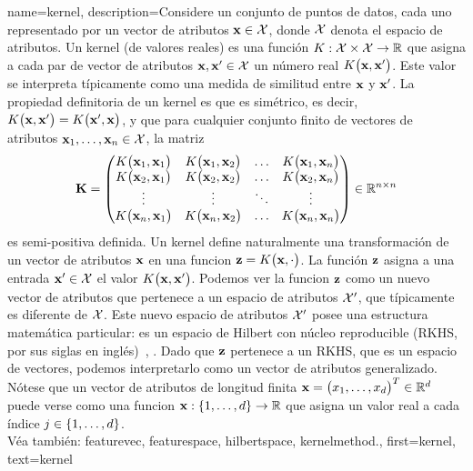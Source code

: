 	{name={kernel}, 
		description={Considere un conjunto de puntos de datos, cada uno representado por un vector de atributos
			${\bf x} \in \mathcal{X}$, donde $\mathcal{X}$ denota el espacio de atributos. 
			Un kernel (de valores reales) es una función
			$K: \mathcal{X} \times \mathcal{X} \rightarrow \mathbb{R}$ que asigna a cada par de 
			vector de atributos ${\bf x}, {\bf x}' \in \mathcal{X}$ un número real $K\big({\bf x},{\bf x}'\big)$. 
			Este valor se interpreta típicamente como una medida de similitud entre ${\bf x}$ y ${\bf x}'$. 
			La propiedad definitoria de un kernel es que es simétrico, es decir,
			$K\big({\bf x},{\bf x}'\big) = K\big({\bf x}',{\bf x}\big)$, y que 
			para cualquier conjunto finito de vectores de atributos ${\bf x}_1, \ldots, {\bf x}_n \in \mathcal{X}$, la matriz 
			\begin{equation}
				\nonumber
				\mathbf{K} = \begin{pmatrix}
					K\big({\bf x}_1,{\bf x}_1\big) & K\big({\bf x}_1,{\bf x}_2\big) & \ldots & K\big({\bf x}_1,{\bf x}_n\big) \\
					K\big({\bf x}_2,{\bf x}_1\big) & K\big({\bf x}_2,{\bf x}_2\big) & \ldots & K\big({\bf x}_2,{\bf x}_n\big) \\
					\vdots											
					& \vdots & \ddots & \vdots \\
					K\big({\bf x}_n,{\bf x}_1\big) & K\big({\bf x}_n,{\bf x}_2\big) & \ldots & K\big({\bf x}_n,{\bf x}_n\big) 
				\end{pmatrix} \in \mathbb{R}^{n \times n}
			\end{equation}
			es semi-positiva definida. 
			Un kernel define naturalmente una transformación de un vector de atributos ${\bf x}$ en una 
			funcion ${\bf z} = K\big({\bf x},\cdot\big)$. La función ${\bf z}$ asigna a una entrada 
			${\bf x}' \in \mathcal{X}$ el valor $K\big({\bf x},{\bf x}'\big)$. 
			Podemos ver la funcion ${\bf z}$ como un nuevo vector de atributos que pertenece a un 
			espacio de atributos $\mathcal{X}'$, que típicamente es diferente de $\mathcal{X}$. 
			Este nuevo espacio de atributos $\mathcal{X}'$ posee una estructura matemática particular: 
			es un espacio de Hilbert con núcleo reproducible (RKHS, por sus siglas en inglés)~\cite{LearningKernelsBook}, \cite{LampertNowKernel}.
			Dado que ${\bf z}$ pertenece a un RKHS, que es un espacio de vectores, podemos interpretarlo como un 
			vector de atributos generalizado. Nótese que un vector de atributos de longitud finita 
			${\bf x}=\big(x_{1},\ldots,x_{d} \big)^{T} \in \mathbb{R}^{d}$ 
			puede verse como una funcion ${\bf x}: \{1, \ldots, d\} \rightarrow \mathbb{R}$ 
			que asigna un valor real a cada índice $j \in \{1,\ldots,d\}$.
			\\
			Véa también: \gls{featurevec}, \gls{featurespace}, \gls{hilbertspace}, \gls{kernelmethod}.},
		first={kernel},
		text={kernel} 
	}
	

